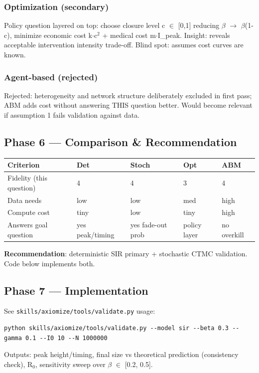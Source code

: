 \documentclass[11pt]{article}
\begin{document}
\subsubsection*{Optimization (secondary)}
Policy question layered on top: choose closure level c $\in$ [0,1] reducing $\beta$ $\to$ $\beta$(1-c), minimize economic cost k$\cdot$c$^2$ + medical cost m$\cdot$I\_peak. Insight: reveals acceptable intervention intensity trade-off. Blind spot: assumes cost curves are known.\\
\subsubsection*{Agent-based (rejected)}
Rejected: heterogeneity and network structure deliberately excluded in first pass; ABM adds cost without answering THIS question better. Would become relevant if assumption 1 fails validation against data.\\
\subsection*{Phase 6 --- Comparison \& Recommendation}
\begin{tabular}{lllll}
\toprule
Criterion & Det & Stoch & Opt & ABM \\
\midrule
Fidelity (this question) & 4 & 4 & 3 & 4 \\
Data needs & low & low & med & high \\
Compute cost & tiny & low & tiny & high \\
Answers goal question & yes peak/timing & yes fade-out prob & policy layer & no overkill \\
\bottomrule
\end{tabular}
\textbf{Recommendation}: deterministic SIR primary + stochastic CTMC validation. Code below implements both.\\
\subsection*{Phase 7 --- Implementation}
See \texttt{skills/axiomize/tools/validate.py} usage:\\
\begin{verbatim}
python skills/axiomize/tools/validate.py --model sir --beta 0.3 --gamma 0.1 --I0 10 --N 1000000
\end{verbatim}
Outputs: peak height/timing, final size vs theoretical prediction (consistency check), R$_{0}$, sensitivity sweep over $\beta$ $\in$ [0.2, 0.5].\\
\end{document}
